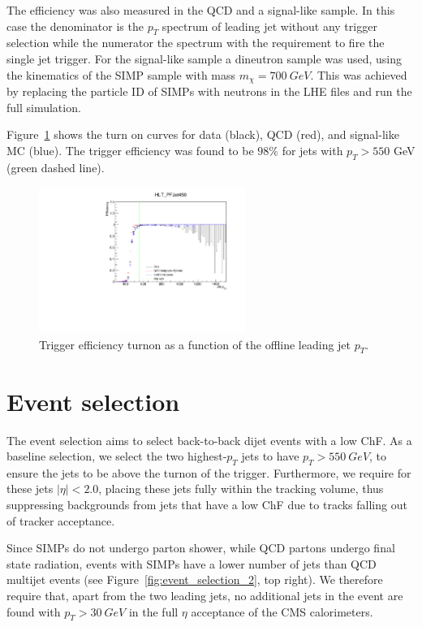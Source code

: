 The efficiency was also measured in the QCD and a signal-like sample. In this case the denominator is the $p_T$ spectrum of leading jet without any trigger selection while the numerator the spectrum with the requirement to fire the single jet trigger. For the signal-like sample a dineutron sample was used, using the kinematics of the SIMP sample with mass $m_{\chi}=\SI{700}{GeV}$. This was achieved by replacing the particle ID of SIMPs with neutrons in the LHE files and run the full simulation.

Figure~\ref{fig:ptturnon} shows the turn on curves for data (black), QCD (red), and signal-like MC (blue). The trigger efficiency was found to be $98\%$ for jets with $p_{T}>550$ GeV (green dashed line).

\begin{figure}[h]
  \centering
  \includegraphics[width=0.6\textwidth]{figures/trigger/pt_HLT_PFJet450.pdf}
  \caption{Trigger efficiency turnon as a function of the offline leading jet $p_T$.}
  \label{fig:ptturnon}
\end{figure}

\section{Event selection}

The event selection aims to select back-to-back dijet events with a low ChF. As a baseline selection, we select the two highest-$p_T$ jets to have $p_T > \SI{550}{GeV}$, to ensure the jets to be above the turnon of the trigger. Furthermore, we require for these jets $|\eta| < 2.0$, placing these jets fully within the tracking volume, thus suppressing backgrounds from jets that have a low ChF due to tracks falling out of tracker acceptance. 

Since SIMPs do not undergo parton shower, while QCD partons undergo final state radiation, events with SIMPs have a lower number of jets than QCD multijet events (see Figure~\ref{fig:event_selection_2}, top right). We therefore require that, apart from the two leading jets, no additional jets in the event are found with $p_T>\SI{30}{GeV}$ in the full $\eta$ acceptance of the CMS calorimeters. 

